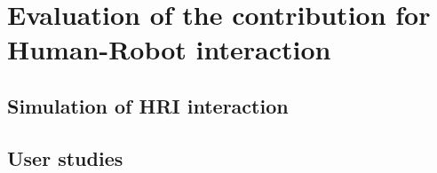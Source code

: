 \chapter{Evaluation of the contribution for Human-Robot interaction}
\label{chapter|evaluation-for-hri}

\section{Simulation of HRI interaction}
\label{sect|simulation}

\section{User studies}
\label{sect|userstudies}
